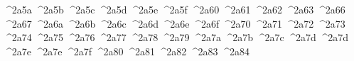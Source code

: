 {  ^^^^2a5a%
  ^^^^2a5b%
  ^^^^2a5c%
  ^^^^2a5d%
  ^^^^2a5e%
  ^^^^2a5f%
  ^^^^2a60%
  ^^^^2a61%
  ^^^^2a62%
  ^^^^2a63%
  ^^^^2a66%
  ^^^^2a67%
  ^^^^2a6a%
  ^^^^2a6b%
  ^^^^2a6c%
  ^^^^2a6d%
  ^^^^2a6e%
  ^^^^2a6f%
  ^^^^2a70%
  ^^^^2a71%
  ^^^^2a72%
  ^^^^2a73%
  ^^^^2a74%
  ^^^^2a75%
  ^^^^2a76%
  ^^^^2a77%
  ^^^^2a78%
  ^^^^2a79%
  ^^^^2a7a%
  ^^^^2a7b%
  ^^^^2a7c%
  ^^^^2a7d%
  ^^^^2a7d%
  ^^^^2a7e%
  ^^^^2a7e%
  ^^^^2a7f%
  ^^^^2a80%
  ^^^^2a81%
  ^^^^2a82%
  ^^^^2a83%
  ^^^^2a84%
}
